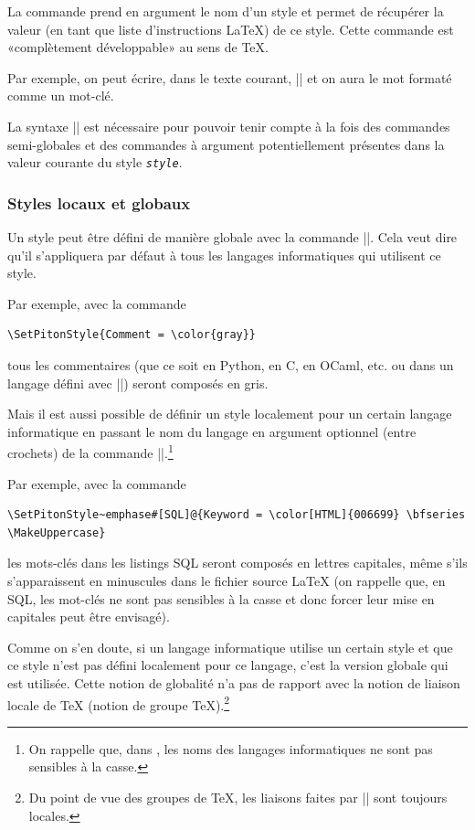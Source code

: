 \documentclass[dvipsnames,svgnames]{article}
\begin{document}
\bigskip
{} La commande  prend en argument le
nom d'un style et permet de récupérer la valeur (en tant que liste d'instructions LaTeX)
de ce style. Cette commande est «complètement développable» au sens de TeX.

\smallskip
Par exemple, on peut écrire, dans le texte courant, |{}| et
on aura le mot {} formaté comme un mot-clé.

\smallskip
La syntaxe |{}| est nécessaire pour pouvoir
tenir compte à la fois des commandes semi-globales et des commandes à argument
potentiellement présentes dans la valeur courante du style \texttt{\textsl{style}}.


\subsubsection{Styles locaux et globaux}

Un style peut être défini de manière globale avec la commande |\SetPitonStyle|. Cela veut
dire qu'il s'appliquera par défaut à tous les langages informatiques qui utilisent ce
style.

\medskip
Par exemple, avec la commande 
\begin{Verbatim}
\SetPitonStyle{Comment = \color{gray}}
\end{Verbatim}
tous les commentaires (que ce soit en Python, en C, en OCaml, etc. ou dans un langage
défini avec |\NewPitonLanguage|) seront composés en gris.

\bigskip
Mais il est aussi possible de définir un style localement pour un certain langage
informatique en passant le nom du langage en argument optionnel (entre crochets) de la
commande |\SetPitonStyle|.\footnote{On rappelle que, dans , les noms des
  langages informatiques ne sont pas sensibles à la casse.}

\medskip
Par exemple, avec la commande 
\begin{Verbatim}
\SetPitonStyle~emphase#[SQL]@{Keyword = \color[HTML]{006699} \bfseries \MakeUppercase}
\end{Verbatim}
les mots-clés dans les listings SQL seront composés en lettres capitales, même s'ils
s'apparaissent en minuscules dans le fichier source LaTeX (on rappelle que, en SQL, les
mot-clés ne sont pas sensibles à la casse et donc forcer leur mise en capitales peut être
envisagé).

\medskip
Comme on s'en doute, si un langage informatique utilise un certain style et que ce style
n'est pas défini localement pour ce langage, c'est la version globale qui est utilisée.
Cette notion de globalité n'a pas de rapport avec la notion de liaison locale de TeX
(notion de groupe TeX).\footnote{Du point de vue des groupes de TeX, les liaisons faites
  par |\SetPitonStyle| sont toujours locales.}
\end{document}
